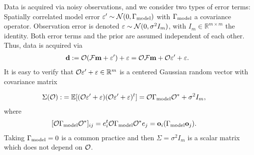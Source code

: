 
Data is acquired via noisy observations, and we consider two types of
error terms: Spatially correlated model error $\varepsilon' \sim
\mathcal{N}(0,\Gamma_{\textup{model}})$ with $\Gamma_{\textup{model}}$ a covariance operator. Observation
error is denoted $\varepsilon \sim \mathcal{N}(0, \sigma^2 I_m)$, with $I_m \in
\mathbb{R}^{m \times m}$ the identity. Both error terms and the prior
are assumed independent of each other. Thus, data is acquired via
\begin{align}\label{eq:inverse problem}
  \data := \obs (\fwd \param + \eps') + \eps = \obs \fwd \param + \obs \eps' + \eps.
\end{align}
It is easy to verify that $\mathcal{O} \varepsilon' + \varepsilon \in \mathbb{R}^m$ is a centered
Gaussian random vector with covariance matrix

\begin{align}\label{eq:Sigma}
  \begin{split}
    \Sigma(\obs) :&= \mathbb{E}[ (\obs \eps' + \eps) (\obs \eps' +
      \eps)^t ]
    = \obs \modcov \obs^* + \sigma^2I_m , 
  \end{split}
\end{align}
where
\begin{align}\label{eq:modcov explained}
  \begin{split}
    [\obs \modcov \obs^*]_{ij} & = e_i^t \obs \modcov \obs^* e_j 
    = \meas_i (\modcov \meas_j).%
  \end{split}
\end{align}
Taking $\Gamma_{\textup{model}} = 0$ is a common practice
\cite{Tarantola05,Kaipio2006,Vogel02} and then $\Sigma = \sigma^2I_m$
is a scalar matrix which does not depend on $\mathcal{O}$.

